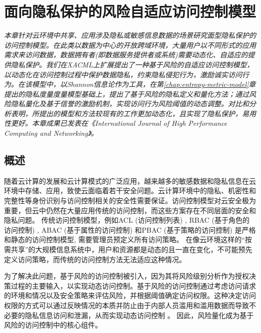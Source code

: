 \chapter{面向隐私保护的风险自适应访问控制模型}
\label{chap:RaBAC-for-privacy}

\textit{ }

\textit{本章针对云环境中共享、应用涉及隐私或敏感信息数据的场景研究面型隐私保护的访问控制模型。在此类以数据为中心的开放跨域环境，大量用户以不同形式的应用需求来访问数据，数据拥有者(即数据服务提供者或系统)需要动态化、自适应的提供隐私保护。我们在XACML上扩展提出了一种基于风险的自适应访问控制模型，以动态化在访问控制过程中保护数据隐私，约束隐私侵犯行为，激励诚实访问行为。在该模型中，以Shannon信息论作为工具，在第\ref{chap:entropy-metric-model}章提出的隐私度量度量模型基础上，提出了基于风险的隐私定义和量化方法；通过风险隐私量化及基于信誉的激励机制，实现访问行为风险阈值的动态调整。对比和分析表明，所提出的模型和方法较现有的工作更加动态化，且实现了隐私保护，易用性更好。本章成果已发表在《International Journal of High Performance Computing and Networking》。
}
\section{概述}
\label{sec:intro}
随着云计算的发展和云计算模式的广泛应用，越来越多的敏感数据和隐私信息在云环境中存储、应用，致使云面临着若干安全问题。云计算环境中的隐私、机密性和完整性等身份识别与访问控制相关的安全性需要保证。访问控制模型对云安全极为重要，但云中仍然在大量应用传统的访问控制，而这些方案存在不同层面的安全和隐私问题。
传统访问控制模型，例如ACL (访问控制列表) \cite{qian2001acla}, RBAC (基于角色的访问控制) \cite{jung2012cribac}, ABAC (基于属性的访问控制) \cite{zhang2011attribute}和PBAC (基于策略的访问控制) \cite{huang2011policy} 是严格和静态的访问控制模型, 需要管理员预定义所有访问策略。 在像云环境这样的“按需共享”的大规模信息系统中，用户和资源都是动态的且一直在变化，不可能预先定义访问策略，而传统的访问控制方法无法适应这种情况。

为了解决此问题，基于风险的访问控制\cite{ni2010risk,shaikh2012dynamic,wang2011quantified,choi2015framework}被引入，因为其将风险级别分析作为授权决策过程的主要输入，以实现动态访问控制。基于风险的访问控制通过考虑访问请求的环境和情况以及安全策略来评估风险，并根据阈值确定访问权限。这种决定访问权限的方式可以通过反映情况的本质并防止由于内部人员滥用和滥用数据而导致不必要的隐私信息访问和泄漏，从而实现动态访问控制 \cite{chen2011risk}。 因此，风险量化成为基于风险的访问控制中的核心组件。

